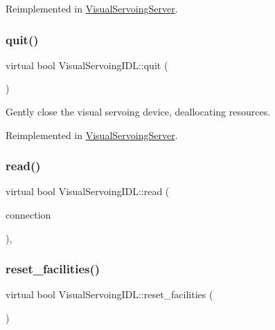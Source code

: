 Reimplemented in \hyperlink{classVisualServoingServer_ad3668e0fc8818f9d2827bbc50087d353}{Visual\+Servoing\+Server}.

\mbox{\label{classVisualServoingIDL_a3d5503e1d4bb2b25a11cbd5357b3013b}} 
\subsubsection{\texorpdfstring{quit()}{quit()}}
{\footnotesize\ttfamily virtual bool Visual\+Servoing\+I\+D\+L\+::quit (\begin{DoxyParamCaption}{ }\end{DoxyParamCaption})\hspace{0.3cm}{\ttfamily [virtual]}}



Gently close the visual servoing device, deallocating resources. 



Reimplemented in \hyperlink{classVisualServoingServer_ac438c7abfb838df458f85e250ead3222}{Visual\+Servoing\+Server}.

\mbox{\label{classVisualServoingIDL_a97106bf829447896de03680d78b960a5}} 
\subsubsection{\texorpdfstring{read()}{read()}}
{\footnotesize\ttfamily virtual bool Visual\+Servoing\+I\+D\+L\+::read (\begin{DoxyParamCaption}\item[{yarp\+::os\+::\+Connection\+Reader \&}]{connection }\end{DoxyParamCaption})\hspace{0.3cm}{\ttfamily [override]}, {\ttfamily [virtual]}}

\mbox{\label{classVisualServoingIDL_a23929f03db99f80426a859cdad68e48c}} 
\subsubsection{\texorpdfstring{reset\+\_\+facilities()}{reset\_facilities()}}
{\footnotesize\ttfamily virtual bool Visual\+Servoing\+I\+D\+L\+::reset\+\_\+facilities (\begin{DoxyParamCaption}{ }\end{DoxyParamCaption})\hspace{0.3cm}{\ttfamily [virtual]}}



